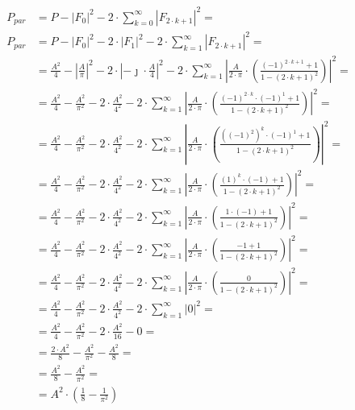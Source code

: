 \begin{task}

\begin{align*}
P_{par} &= P - \left| F_{0} \right|^2 -2\cdot \sum_{k=0}^{\infty} \left| F_{2\cdot k+1} \right|^2=\\
P_{par} &= P - \left| F_{0} \right|^2 -2 \cdot \left| F_{1} \right|^2 - 2\cdot \sum_{k=1}^{\infty} \left| F_{2\cdot k+1} \right|^2=\\
&= \frac{A^2}{4} - \left| \frac{A}{\pi} \right|^2 -2 \cdot \left| -\jmath \cdot \frac{A}{4} \right|^2 - 2\cdot \sum_{k=1}^{\infty} \left| \frac{A}{2 \cdot \pi} \cdot \left(\frac{(-1)^{2\cdot k+1}+1}{1-\left(2\cdot k+1\right)^2}\right)\right|^2=\\
&= \frac{A^2}{4} - \frac{A^2}{\pi^2} -2 \cdot \frac{A^2}{4^2} - 2\cdot \sum_{k=1}^{\infty} \left| \frac{A}{2 \cdot \pi} \cdot \left(\frac{(-1)^{2\cdot k}\cdot (-1)^1+1}{1-\left(2\cdot k+1\right)^2}\right)\right|^2=\\
&= \frac{A^2}{4} - \frac{A^2}{\pi^2} -2 \cdot \frac{A^2}{4^2} - 2\cdot \sum_{k=1}^{\infty} \left| \frac{A}{2 \cdot \pi} \cdot \left(\frac{\left((-1)^{2}\right)^{k}\cdot (-1)^1+1}{1-\left(2\cdot k+1\right)^2}\right)\right|^2=\\
&= \frac{A^2}{4} - \frac{A^2}{\pi^2} -2 \cdot \frac{A^2}{4^2} - 2\cdot \sum_{k=1}^{\infty} \left|\frac{A}{2 \cdot \pi} \cdot \left(\frac{\left(1\right)^{k}\cdot (-1)+1}{1-\left(2\cdot k+1\right)^2}\right)\right|^2=\\
&= \frac{A^2}{4} - \frac{A^2}{\pi^2} -2 \cdot \frac{A^2}{4^2} - 2\cdot \sum_{k=1}^{\infty} \left| \frac{A}{2 \cdot \pi} \cdot \left(\frac{1\cdot (-1)+1}{1-\left(2\cdot k+1\right)^2}\right)\right|^2=\\
&= \frac{A^2}{4} - \frac{A^2}{\pi^2} -2 \cdot \frac{A^2}{4^2} - 2\cdot \sum_{k=1}^{\infty} \left| \frac{A}{2 \cdot \pi} \cdot \left(\frac{-1+1}{1-\left(2\cdot k+1\right)^2}\right)\right|^2=\\
&= \frac{A^2}{4} - \frac{A^2}{\pi^2} -2 \cdot \frac{A^2}{4^2} - 2\cdot \sum_{k=1}^{\infty} \left| \frac{A}{2 \cdot \pi} \cdot \left(\frac{0}{1-\left(2\cdot k+1\right)^2}\right)\right|^2=\\
&= \frac{A^2}{4} - \frac{A^2}{\pi^2} -2 \cdot \frac{A^2}{4^2} - 2\cdot \sum_{k=1}^{\infty} \left| 0\right|^2=\\
&= \frac{A^2}{4} - \frac{A^2}{\pi^2} -2 \cdot \frac{A^2}{16} - 0=\\
&= \frac{2\cdot A^2}{8} - \frac{A^2}{\pi^2} - \frac{A^2}{8}=\\
&= \frac{A^2}{8} - \frac{A^2}{\pi^2}=\\
&= A^2 \cdot \left( \frac{1}{8} - \frac{1}{\pi^2}\right)
\end{align*}


\end{task}
